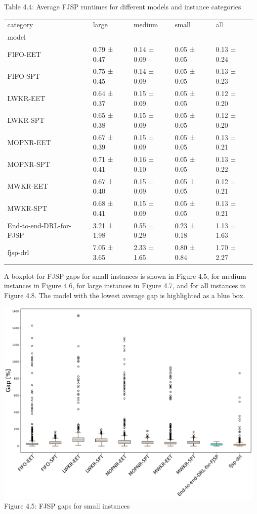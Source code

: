\begin{table}[H]
    Table 4.4: Average FJSP runtimes for different models and instance categories\\
    \vspace{1mm}
    \footnotesize 
    \begin{tabular}{lllll}
        \toprule
        category & large & medium & small & all \\
        model &  &  &  &  \\
        \midrule
        FIFO-EET & 0.79 ± 0.47 & 0.14 ± 0.09 & 0.05 ± 0.05 & 0.13 ± 0.24 \\
        FIFO-SPT & 0.75 ± 0.45 & 0.14 ± 0.09 & 0.05 ± 0.05 & 0.13 ± 0.23 \\
        LWKR-EET & 0.64 ± 0.37 & 0.15 ± 0.09 & 0.05 ± 0.05 & 0.12 ± 0.20 \\
        LWKR-SPT & 0.65 ± 0.38 & 0.15 ± 0.09 & 0.05 ± 0.05 & 0.12 ± 0.20 \\
        MOPNR-EET & 0.67 ± 0.39 & 0.15 ± 0.09 & 0.05 ± 0.05 & 0.13 ± 0.21 \\
        MOPNR-SPT & 0.71 ± 0.41 & 0.16 ± 0.10 & 0.05 ± 0.05 & 0.13 ± 0.22 \\
        MWKR-EET & 0.67 ± 0.40 & 0.15 ± 0.09 & 0.05 ± 0.05 & 0.12 ± 0.21 \\
        MWKR-SPT & 0.68 ± 0.41 & 0.15 ± 0.09 & 0.05 ± 0.05 & 0.13 ± 0.21 \\
        End-to-end-DRL-for-FJSP & 3.21 ± 1.98 & 0.55 ± 0.29 & 0.23 ± 0.18 & 1.13 ± 1.63 \\
        fjsp-drl & 7.05 ± 3.65 & 2.33 ± 1.65 & 0.80 ± 0.84 & 1.70 ± 2.27 \\
        \bottomrule
    \end{tabular}
\end{table}


A boxplot for FJSP gaps for small instances is shown in Figure 4.5, for medium instances in Figure 4.6, for large instances in Figure 4.7, and for all instances in Figure 4.8. The model with the lowest average gap is highlighted as a blue box.

\begin{center}
    \includegraphics[width=0.8\linewidth]{images/horizontal_boxplot_fjsp_small.pdf}\\
    Figure 4.5: FJSP gaps for small instances
\end{center}


